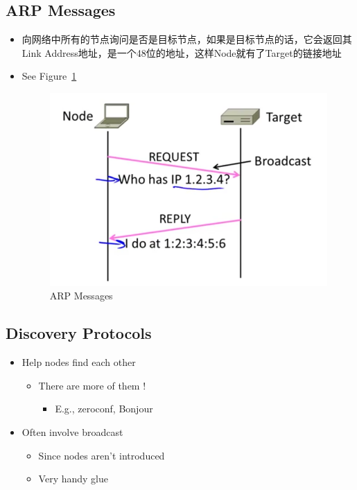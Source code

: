 \documentclass[12pt]{ctexart}   %
\begin{document}
	\subsection{ARP Messages}
	\begin{itemize}
		\item 向网络中所有的节点询问是否是目标节点，如果是目标节点的话，它会返回其Link Address地址，是一个48位的地址，这样Node就有了Target的链接地址
		\item See Figure~\ref{fig:4-6-4}
		
		\begin{figure}[h!] %
		\centering
		 \includegraphics[scale=0.7]{images/4-6-4}
		\caption{ARP Messages}
		 \label{fig:4-6-4}
		 \end{figure}
	\end{itemize}
	
	\subsection{Discovery Protocols}
	\begin{itemize}
		\item Help nodes find each other
		\begin{itemize}
			\item There are more of them !
			\begin{itemize}
				\item E.g., zeroconf, Bonjour
			\end{itemize}
		\end{itemize}
		
		\item Often involve broadcast
		\begin{itemize}
			\item Since nodes aren't introduced
			\item Very handy glue
		\end{itemize}
	\end{itemize}
\end{document}
